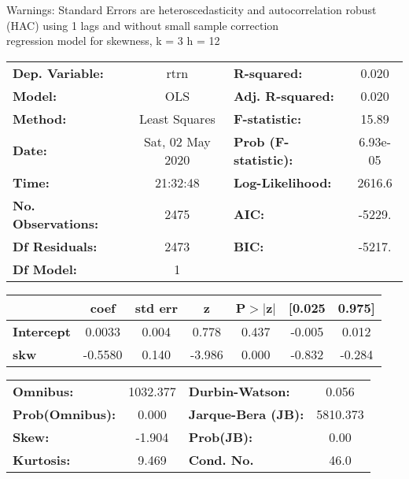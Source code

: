 Warnings: \newline
 [1] Standard Errors are heteroscedasticity and autocorrelation robust (HAC) using 1 lags and without small sample correction\\ 

regression model for skewness, k = 3 h = 12\begin{center}
\begin{tabular}{lclc}
\toprule
\textbf{Dep. Variable:}    &       rtrn       & \textbf{  R-squared:         } &     0.020   \\
\textbf{Model:}            &       OLS        & \textbf{  Adj. R-squared:    } &     0.020   \\
\textbf{Method:}           &  Least Squares   & \textbf{  F-statistic:       } &     15.89   \\
\textbf{Date:}             & Sat, 02 May 2020 & \textbf{  Prob (F-statistic):} &  6.93e-05   \\
\textbf{Time:}             &     21:32:48     & \textbf{  Log-Likelihood:    } &    2616.6   \\
\textbf{No. Observations:} &        2475      & \textbf{  AIC:               } &    -5229.   \\
\textbf{Df Residuals:}     &        2473      & \textbf{  BIC:               } &    -5217.   \\
\textbf{Df Model:}         &           1      & \textbf{                     } &             \\
\bottomrule
\end{tabular}
\begin{tabular}{lcccccc}
                   & \textbf{coef} & \textbf{std err} & \textbf{z} & \textbf{P$> |$z$|$} & \textbf{[0.025} & \textbf{0.975]}  \\
\midrule
\textbf{Intercept} &       0.0033  &        0.004     &     0.778  &         0.437        &       -0.005    &        0.012     \\
\textbf{skw}       &      -0.5580  &        0.140     &    -3.986  &         0.000        &       -0.832    &       -0.284     \\
\bottomrule
\end{tabular}
\begin{tabular}{lclc}
\textbf{Omnibus:}       & 1032.377 & \textbf{  Durbin-Watson:     } &    0.056  \\
\textbf{Prob(Omnibus):} &   0.000  & \textbf{  Jarque-Bera (JB):  } & 5810.373  \\
\textbf{Skew:}          &  -1.904  & \textbf{  Prob(JB):          } &     0.00  \\
\textbf{Kurtosis:}      &   9.469  & \textbf{  Cond. No.          } &     46.0  \\
\bottomrule
\end{tabular}
\end{center}

